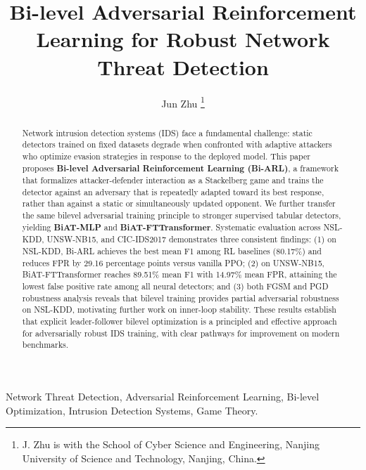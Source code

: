 \documentclass[journal]{IEEEtran}
\begin{document}
\title{Bi-level Adversarial Reinforcement Learning for Robust Network Threat Detection}

\author{Jun Zhu
    \thanks{J. Zhu is with the School of Cyber Science and Engineering, Nanjing University of Science and Technology, Nanjing, China.}
}

\maketitle

\begin{abstract}
    Network intrusion detection systems (IDS) face a fundamental challenge: static detectors trained on fixed datasets degrade when confronted with adaptive attackers who optimize evasion strategies in response to the deployed model. This paper proposes \textbf{Bi-level Adversarial Reinforcement Learning (Bi-ARL)}, a framework that formalizes attacker-defender interaction as a Stackelberg game and trains the detector against an adversary that is repeatedly adapted toward its best response, rather than against a static or simultaneously updated opponent. We further transfer the same bilevel adversarial training principle to stronger supervised tabular detectors, yielding \textbf{BiAT-MLP} and \textbf{BiAT-FTTransformer}. Systematic evaluation across NSL-KDD, UNSW-NB15, and CIC-IDS2017 demonstrates three consistent findings: (1) on NSL-KDD, Bi-ARL achieves the best mean F1 among RL baselines (80.17\%) and reduces FPR by 29.16 percentage points versus vanilla PPO; (2) on UNSW-NB15, BiAT-FTTransformer reaches 89.51\% mean F1 with 14.97\% mean FPR, attaining the lowest false positive rate among all neural detectors; and (3) both FGSM and PGD robustness analysis reveals that bilevel training provides partial adversarial robustness on NSL-KDD, motivating further work on inner-loop stability. These results establish that explicit leader-follower bilevel optimization is a principled and effective approach for adversarially robust IDS training, with clear pathways for improvement on modern benchmarks.
\end{abstract}

\begin{IEEEkeywords}
    Network Threat Detection, Adversarial Reinforcement Learning, Bi-level Optimization, Intrusion Detection Systems, Game Theory.
\end{IEEEkeywords}









\end{document}
